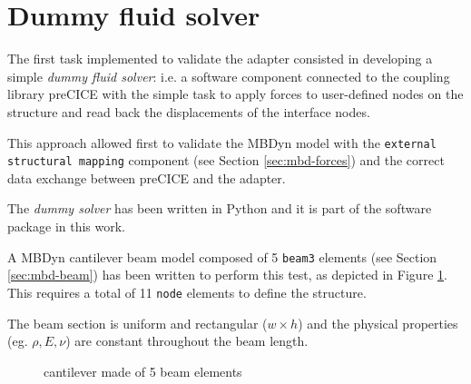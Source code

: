 \section{Dummy fluid solver}
\label{sec:dummy}

The first task implemented to validate the adapter consisted in developing a simple \textit{dummy fluid solver}: i.e. a software component connected to the coupling library preCICE with the simple task to apply forces to user-defined nodes on the structure and read back the displacements of the interface nodes.

This approach allowed first to validate the MBDyn model with the \texttt{external structural mapping} component (see Section \ref{sec:mbd-forces}) and the correct data exchange between preCICE and the adapter. 

The \textit{dummy solver} has been written in Python and it is part of the software package in this work.

A MBDyn cantilever beam model composed of 5 \texttt{beam3} elements (see Section \ref{sec:mbd-beam}) has been written to perform this test, as depicted in Figure \ref{fig:cnt-beams}. This requires a total of 11 \texttt{node} elements to define the structure.

The beam section is uniform and rectangular ($w \times h$) and the physical properties (eg. $\rho, E, \nu$) are constant throughout the beam length. 

\begin{figure}[htbp!]
	    \centering
    	\caption{cantilever made of 5 beam elements}
		\label{fig:cnt-beams}
\end{figure}

